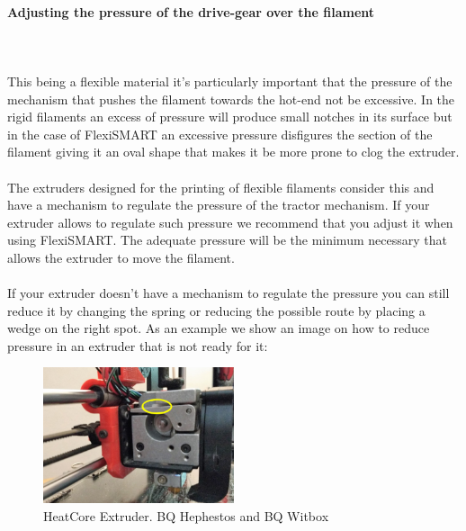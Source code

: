\documentclass[11pt,a4paper]{article}
\begin{document}
	\paragraph{Adjusting the pressure of the drive-gear over the filament}\mbox{}\\\\
This being a flexible material it’s particularly important that the pressure of the mechanism that pushes the filament towards the hot-end not be excessive. In the rigid filaments an excess of pressure will produce small notches in its surface but in the case of FlexiSMART an excessive pressure disfigures the section of the filament giving it an oval shape that makes it be more prone to clog the extruder.
\\\\
The extruders designed for the printing of flexible filaments consider this and have a mechanism to regulate the pressure of the tractor mechanism. If your extruder allows to regulate such pressure we recommend that you adjust it when using FlexiSMART. The adequate pressure will be the minimum necessary that allows the extruder to move the filament.
\\\\
If your extruder doesn’t have a mechanism to regulate the pressure you can still reduce it by changing the spring or reducing the possible route by placing a wedge on the right spot. As an example we show an image on how to reduce pressure in an extruder that is not ready for it:
\begin{figure}[H]
\centering
\includegraphics[width=0.5\textwidth,cfbox=azul_marcos 4pt 0pt]{FOTOS/SOLUCION1}
\caption*{HeatCore Extruder. BQ Hephestos and BQ Witbox}
\end{figure}
\end{document}
